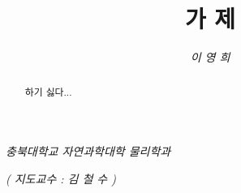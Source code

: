 \title{\textbf{\LARGE 가 제}}
\date{}
\vspace{1.5cm}
\author{\textit{\large {이 영 희}}}
\vspace{0.5cm}

\maketitle

\begin{center}
    \textit{충북대학교 자연과학대학 물리학과}
    \vspace{0.5cm}
    
    \textit{( 지도교수 : 김 철 수 )}
    \vspace{1cm}
\end{center}
    

\begin{abstract}
하기 싫다...
\end{abstract}
